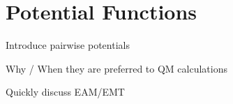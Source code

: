 \section{Potential Functions \pending}
\label{sec:potentials}

\bit
\item Introduce pairwise potentials
\item Why / When they are preferred to QM calculations
\item Quickly discuss EAM/EMT
\eit
